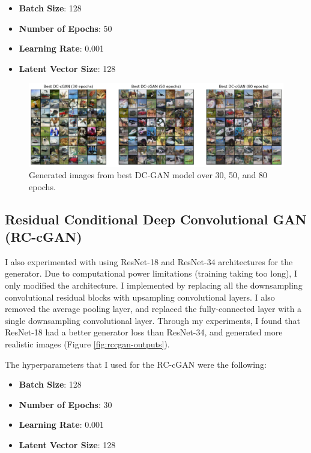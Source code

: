 \documentclass[twoside,11pt]{article}
\begin{document}
\begin{itemize}
  \item \textbf{Batch Size}: 128
  \item \textbf{Number of Epochs}: 50
  \item \textbf{Learning Rate}: 0.001
  \item \textbf{Latent Vector Size}: 128
\end{itemize}

\begin{figure}[h!]
  \centering
  \includegraphics[width=16.5cm]{images/dccgan-experiments/dccgan-outputs.png}
  \caption{Generated images from best DC-GAN model over 30, 50, and 80 epochs.}
  \label{fig:dccgan-outputs}
\end{figure}

\newpage

\subsection{Residual Conditional Deep Convolutional GAN (RC-cGAN)}

I also experimented with using ResNet-18 and ResNet-34 architectures for the generator. Due to computational power limitations (training taking too long), I only modified the architecture. I implemented by replacing all the downsampling convolutional residual blocks with upsampling convolutional layers. I also removed the average pooling layer, and replaced the fully-connected layer with a single downsampling convolutional layer. Through my experiments, I found that ResNet-18 had a better generator loss than ResNet-34, and generated more realistic images (Figure \ref{fig:rccgan-outputs}). 

The hyperparameters that I used for the RC-cGAN were the following:

\begin{itemize}
  \item \textbf{Batch Size}: 128
  \item \textbf{Number of Epochs}: 30
  \item \textbf{Learning Rate}: 0.001
  \item \textbf{Latent Vector Size}: 128
\end{itemize}
\end{document}
